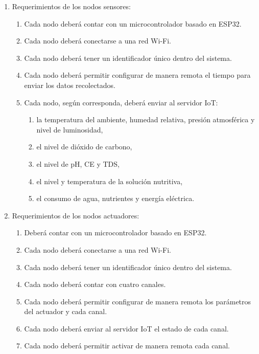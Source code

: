 \begin{enumerate}
	\item Requerimientos de los nodos sensores:
	      \begin{enumerate}
		      \item Cada nodo deberá contar con un microcontrolador basado en ESP32.
		      \item Cada nodo deberá conectarse a una red Wi-Fi.
		      \item Cada nodo deberá tener un identificador único dentro del sistema.
		      \item Cada nodo deberá permitir configurar de manera remota el tiempo para enviar los datos recolectados.
		      \item Cada nodo, según corresponda, deberá enviar al servidor IoT:
		            \begin{enumerate}
			            \item la temperatura del ambiente, humedad relativa, presión atmosférica y nivel de luminosidad,
			            \item el nivel de dióxido de carbono,
			            \item el nivel de pH, CE y TDS,
			            \item el nivel y temperatura de la solución nutritiva,
			            \item el consumo de agua, nutrientes y energía eléctrica.
		            \end{enumerate}
	      \end{enumerate}

	\item Requerimientos de los nodos actuadores:
	      \begin{enumerate}
		      \item Deberá contar con un microcontrolador basado en ESP32.
		      \item Cada nodo deberá conectarse a una red Wi-Fi.
		      \item Cada nodo deberá tener un identificador único dentro del sistema.
		      \item Cada nodo deberá contar con cuatro canales.
		      \item Cada nodo deberá permitir configurar de manera remota los parámetros del actuador y cada canal.
		      \item Cada nodo deberá enviar al servidor IoT el estado de cada canal.
		      \item Cada nodo deberá permitir activar de manera remota cada canal.
	      \end{enumerate}


\end{enumerate}
